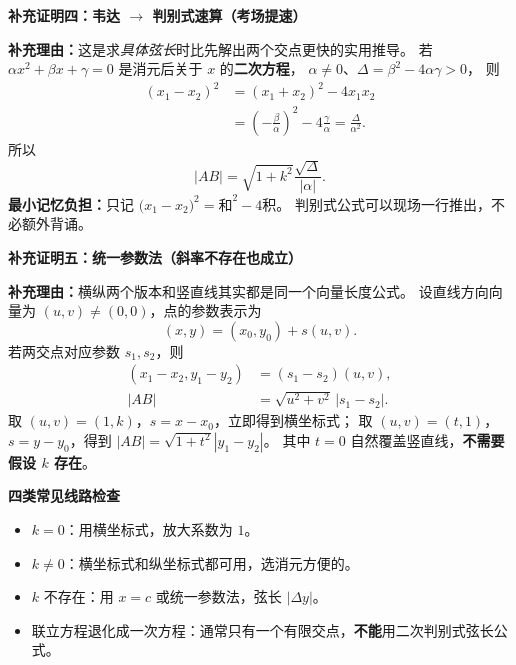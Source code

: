 \clearpage
\begin{proofbox}
\textbf{\textcolor{CProof}{补充证明四：韦达 $\rightarrow$ 判别式速算（考场提速）}}



\textbf{补充理由：}这是求\emph{具体弦长}时比先解出两个交点更快的实用推导。
若 $\alpha x^2+\beta x+\gamma=0$ 是消元后关于 $x$ 的\textbf{二次方程}，
$\alpha\ne0$、$\Delta=\beta^2-4\alpha\gamma>0$，
则
\[
 \begin{aligned}
 (x_1-x_2)^2
 &=(x_1+x_2)^2-4x_1x_2\\
 &=\left(-\frac{\beta}{\alpha}\right)^2
   -4\frac{\gamma}{\alpha}
 =\frac{\Delta}{\alpha^2}.
 \end{aligned}
\]
所以
\[
 \boxed{|AB|=\sqrt{1+k^2}\frac{\sqrt{\Delta}}{|\alpha|}}.
\]
\textbf{最小记忆负担：}只记 $\bigl(x_1-x_2\bigr)^2=\text{和}^2-4\text{积}$。
判别式公式可以现场一行推出，不必额外背诵。

\end{proofbox}
\clearpage
\begin{proofbox}
\textbf{\textcolor{CProof}{补充证明五：统一参数法（斜率不存在也成立）}}



\textbf{补充理由：}横纵两个版本和竖直线其实都是同一个向量长度公式。
设直线方向向量为 $(u,v)\neq(0,0)$，点的参数表示为
\[
 (x,y)=(x_0,y_0)+s(u,v).
\]
若两交点对应参数 $s_1,s_2$，则
\[
 \begin{aligned}
 (x_1-x_2,y_1-y_2)&=(s_1-s_2)(u,v),\\
 |AB|&=\boxed{\sqrt{u^2+v^2}\,|s_1-s_2|}.
 \end{aligned}
\]
取 $(u,v)=(1,k)$，$s=x-x_0$，立即得到横坐标式；
取 $(u,v)=(t,1)$，$s=y-y_0$，得到
$|AB|=\sqrt{1+t^2}|y_1-y_2|$。
其中 $t=0$ 自然覆盖竖直线，\textbf{不需要假设 $k$ 存在}。

\medskip
\textbf{\textcolor{CProof}{四类常见线路检查}}
\begin{itemize}[leftmargin=*,itemsep=0.25em]
 \item $k=0$：用横坐标式，放大系数为 $1$。
 \item $k\ne0$：横坐标式和纵坐标式都可用，选消元方便的。
 \item $k$ 不存在：用 $x=c$ 或统一参数法，弦长 $|\Delta y|$。
 \item 联立方程退化成一次方程：通常只有一个有限交点，\textbf{不能}用二次判别式弦长公式。
\end{itemize}
\end{proofbox}
